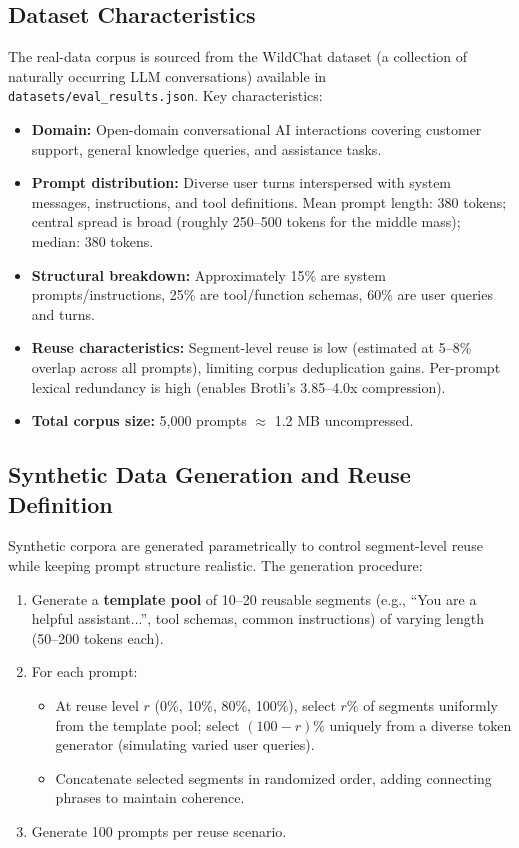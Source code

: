 \documentclass[10pt,conference]{IEEEtran}
\begin{document}
\subsection{Dataset Characteristics}
The real-data corpus is sourced from the WildChat dataset \cite{wildchat2024} (a collection of naturally occurring LLM conversations) available in \texttt{datasets/eval\_results.json}. Key characteristics:
\begin{itemize}
    \item \textbf{Domain:} Open-domain conversational AI interactions covering customer support, general knowledge queries, and assistance tasks.
    \item \textbf{Prompt distribution:} Diverse user turns interspersed with system messages, instructions, and tool definitions. Mean prompt length: 380 tokens; central spread is broad (roughly 250--500 tokens for the middle mass); median: 380 tokens.
    \item \textbf{Structural breakdown:} Approximately 15\% are system prompts/instructions, 25\% are tool/function schemas, 60\% are user queries and turns.
    \item \textbf{Reuse characteristics:} Segment-level reuse is low (estimated at 5--8\% overlap across all prompts), limiting corpus deduplication gains. Per-prompt lexical redundancy is high (enables Brotli's 3.85--4.0x compression).
    \item \textbf{Total corpus size:} 5,000 prompts $\approx$ 1.2 MB uncompressed.
\end{itemize}
\subsection{Synthetic Data Generation and Reuse Definition}
Synthetic corpora are generated parametrically to control segment-level reuse while keeping prompt structure realistic. The generation procedure:
\begin{enumerate}
    \item Generate a \textbf{template pool} of 10--20 reusable segments (e.g., ``You are a helpful assistant...'', tool schemas, common instructions) of varying length (50--200 tokens each).
    \item For each prompt:
    \begin{itemize}
        \item At reuse level $r$ (0\%, 10\%, 80\%, 100\%), select $r\%$ of segments uniformly from the template pool; select $(100-r)\%$ uniquely from a diverse token generator (simulating varied user queries).
        \item Concatenate selected segments in randomized order, adding connecting phrases to maintain coherence.
    \end{itemize}
    \item Generate 100 prompts per reuse scenario.
\end{enumerate}
\end{document}
